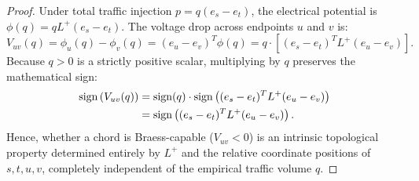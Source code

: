 \documentclass[11pt,a4paper]{article}
\begin{document}
\begin{proof}
Under total traffic injection $p = q (e_s - e_t)$, the electrical potential is $\phi(q) = q L^+ (e_s - e_t)$. The voltage drop across endpoints $u$ and $v$ is:
\begin{equation}
V_{uv}(q) = \phi_u(q) - \phi_v(q) = (e_u - e_v)^T \phi(q) = q \cdot \left[ (e_s - e_t)^T L^+ (e_u - e_v) \right].
\end{equation}
Because $q > 0$ is a strictly positive scalar, multiplying by $q$ preserves the mathematical sign:
\begin{align}
\operatorname{sign}\left( V_{uv}(q) \right) &= \operatorname{sign}(q) \cdot \operatorname{sign}\left( (e_s - e_t)^T L^+ (e_u - e_v) \right) \notag \\
&= \operatorname{sign}\left( (e_s - e_t)^T L^+ (e_u - e_v) \right).
\end{align}
Hence, whether a chord is Braess-capable ($V_{uv} < 0$) is an intrinsic topological property determined entirely by $L^+$ and the relative coordinate positions of $s, t, u, v$, completely independent of the empirical traffic volume $q$.
\end{proof}
\end{document}
